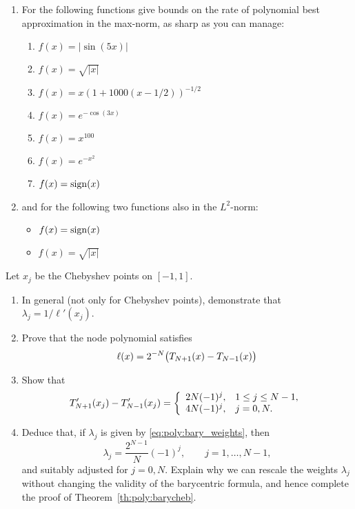 \begin{exercise} 
   \label{exr:poly:examplefunctions}
   \begin{enumerate} \ilist 
   \item For the following functions give bounds on the rate of polynomial best
   approximation in the max-norm, as sharp as you can manage: 
   \begin{enumerate} \ilist
      \item $f(x) = |\sin(5 x)|$ 
      \item $f(x) = \sqrt{|x|}$
      \item $f(x) = x (1 + 1000 (x - 1/2))^{-1/2}$
      \item $f(x) = e^{- \cos(3x)}$
      \item $f(x) = x^{100}$
      \item $f(x) = e^{-x^2}$ 
      \item $f(x) = {\rm sign}(x)$
   \end{enumerate}
   \item and for the following two functions also in the $L^2$-norm:
   \begin{itemize}
      \item $f(x) = {\rm sign}(x)$
      \item $f(x) = \sqrt{|x|}$
   \end{itemize}
   \end{enumerate}
\end{exercise}

\begin{exercise}
   \label{exr:poly:bary}
   Let $x_j$ be the Chebyshev points on $[-1,1]$.
   \begin{enumerate} \ilist
   \item In general (not only for Chebyshev points), demonstrate that $\lambda_j
      = 1 / \ell'(x_j)$.
   \item Prove that the node polynomial satisfies 
   \[
      \ell(x) = 2^{-N} \big(T_{N+1}(x) - T_{N-1}(x)\big)
   \]
   \item Show that 
   \[
      T_{N+1}'(x_j) - T_{N-1}'(x_j) = 
      \left\{ \begin{array}{ll}  
         2N(-1)^j, & 1 \leq j \leq N-1, \\
         4N(-1)^j, & j = 0, N.
       \end{array} \right.
   \]
   \item Deduce that, if $\lambda_j$ is given by \eqref{eq:poly:bary_weights}, then 
   \[
      \lambda_j = \frac{2^{N-1}}{N} (-1)^j, \qquad j = 1, \dots, N-1,
   \]
   and suitably adjusted for $j = 0, N$. Explain why we can rescale the weights
   $\lambda_j$ without changing the validity of the barycentric formula, and
   hence complete the proof of Theorem~\ref{th:poly:barycheb}.
   \qedhere
   \end{enumerate}
\end{exercise}


